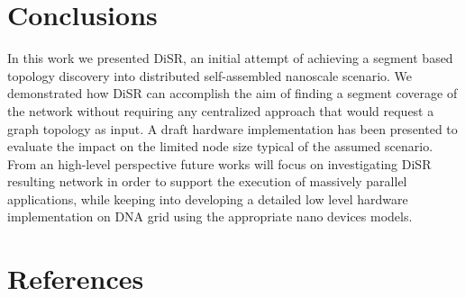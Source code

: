 \documentclass[preprint]{elsarticle}
\newcommand{\disr}{{\sf DiSR}}
\begin{document}







\section{Conclusions}
In this work we presented \disr{}, an initial attempt of achieving a segment based
topology discovery into distributed self-assembled nanoscale scenario. We
demonstrated how \disr{} can accomplish the aim of finding a segment
coverage of the network without requiring any centralized approach
that would request a graph topology as input. A draft hardware
implementation has been presented to evaluate the impact on the limited
node size typical of the assumed scenario. From an high-level
perspective future works will focus on
investigating \disr{} resulting network in order to support the
execution of massively parallel applications, while keeping into
developing a detailed low level hardware implementation on
DNA grid using the appropriate nano devices models.


%
% 
%

%
\section*{References}

\end{document}
